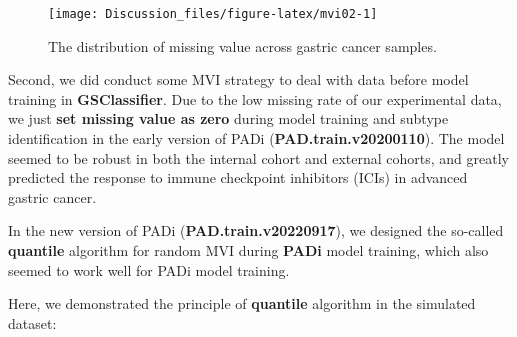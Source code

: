 \documentclass[
  12pt,
]{book}
\begin{document}
\begin{figure}

{\centering \texttt{[image: Discussion\_files/figure-latex/mvi02-1]} 

}

\caption{The distribution of missing value across gastric cancer samples.}\label{fig:mvi02}
\end{figure}

Second, we did conduct some MVI strategy to deal with data before model training in \textbf{GSClassifier}. Due to the low missing rate of our experimental data, we just \textbf{set missing value as zero} during model training and subtype identification in the early version of PADi (\textbf{PAD.train.v20200110}). The model seemed to be robust in both the internal cohort and external cohorts, and greatly predicted the response to immune checkpoint inhibitors (ICIs) in advanced gastric cancer.

In the new version of PADi (\textbf{PAD.train.v20220917}), we designed the so-called \textbf{quantile} algorithm for random MVI during \textbf{PADi} model training, which also seemed to work well for PADi model training.

Here, we demonstrated the principle of \textbf{quantile} algorithm in the simulated dataset:
\end{document}
